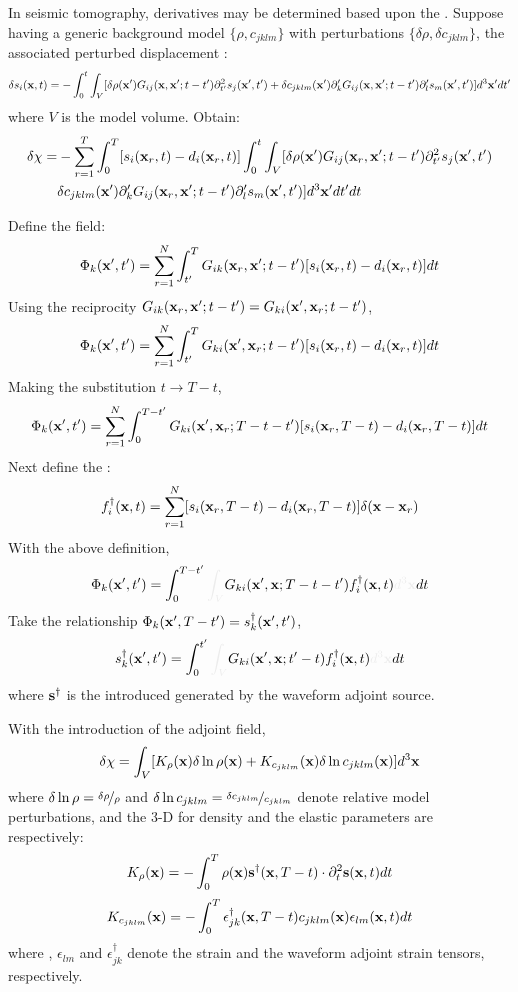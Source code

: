 In seismic tomography,
\Frechet derivatives may be determined based upon the .
Suppose having a generic background model $\{\rho,c_{jklm}\}$
with perturbations $\{\delta\rho,\delta c_{jklm}\}$,
the associated perturbed displacement
:
\[ \delta s_i(\mathbf{x},t)=-\int_0^t\int_V[\delta\rho(\mathbf{x}')G_{ij}(\mathbf{x},\mathbf{x}';t-t')\partial_{t'}^2s_j(\mathbf{x}',t')+\delta c_{jklm}(\mathbf{x}')\partial_k^\prime G_{ij}(\mathbf{x},\mathbf{x}';t-t')\partial_l^\prime s_m(\mathbf{x}',t')]d^3\mathbf{x}'dt' \]
where $V$ is the model volume. Obtain:
\begin{align*}
  \delta\chi= & -\sum_{r=1}^T\int_0^T[s_i(\mathbf{x}_r,t)-d_i(\mathbf{x}_r,t)]\int_0^t\int_V[\delta\rho(\mathbf{x}')G_{ij}(\mathbf{x}_r,\mathbf{x}';t-t')\partial_{t'}^2s_j(\mathbf{x}',t') \\
    & \delta c_{jklm}(\mathbf{x}')\partial_k^\prime G_{ij}(\mathbf{x}_r,\mathbf{x}';t-t')\partial_l^\prime s_m(\mathbf{x}',t')]d^3\mathbf{x}'dt'dt
\end{align*}

Define the field:
\[ \Phi_k(\mathbf{x}',t')=\sum_{r=1}^N\int_{t'}^TG_{ik}(\mathbf{x}_r,\mathbf{x}';t-t')[s_i(\mathbf{x}_r,t)-d_i(\mathbf{x}_r,t)]dt \]
Using the reciprocity $G_{ik}(\mathbf{x}_r,\mathbf{x}';t-t')=G_{ki}(\mathbf{x}',\mathbf{x}_r;t-t')$,
\[ \Phi_k(\mathbf{x}',t')=\sum_{r=1}^N\int_{t'}^TG_{ki}(\mathbf{x}',\mathbf{x}_r;t-t')[s_i(\mathbf{x}_r,t)-d_i(\mathbf{x}_r,t)]dt \]
Making the substitution $t\rightarrow T-t$,
\[ \Phi_k(\mathbf{x}',t')=\sum_{r=1}^N\int_0^{T-t'}G_{ki}(\mathbf{x}',\mathbf{x}_r;T-t-t')[s_i(\mathbf{x}_r,T-t)-d_i(\mathbf{x}_r,T-t)]dt \]
Next define the :
\[ f_i^\dagger(\mathbf{x},t)=\sum_{r=1}^N[s_i(\mathbf{x}_r,T-t)-d_i(\mathbf{x}_r,T-t)]\delta(\mathbf{x}-\mathbf{x}_r) \]
With the above definition,
\[ \Phi_k(\mbf x',t')=\int_0^{T-t'}\myde{\int_V}G_{ki}(\mbf x',\mbf x;T-t-t')f_i^\dagger(\mbf x,t)\myde{d^3\mbf x}dt \]
Take the relationship $\Phi_k(\mathbf{x}',T-t')=s_k^\dagger(\mathbf{x}',t')$,
\[ s_k^\dagger(\mbf x',t')=\int_0^{t'}\myde{\int_V}G_{ki}(\mbf x',\mbf x;t'-t)f_i^\dagger(\mbf x,t)\myde{d^3\mbf x}dt \]
where $\mathbf{s}^\dagger$ is the introduced 
generated by the waveform adjoint source.

With the introduction of the adjoint field,
\[ \delta\chi=\int_V[K_\rho(\mathbf{x})\delta\ln\rho(\mathbf{x})+K_{c_{jklm}}(\mathbf{x})\delta\ln c_{jklm}(\mathbf{x})]d^3\mathbf{x} \]
where
$\delta\ln\rho=\nicefrac{\delta\rho}{\rho}$ and $\delta\ln c_{jklm}=\nicefrac{\delta c_{jklm}}{c_{jklm}}$
denote relative model perturbations,
and the 3-D 
for density and the elastic parameters are respectively:
\[ K_\rho(\mathbf{x})=-\int_0^T\rho(\mathbf{x})\mathbf{s}^\dagger(\mathbf{x},T-t)\cdot\partial_t^2\mathbf{s}(\mathbf{x},t)dt \]
\[ K_{c_{jklm}}(\mathbf{x})=-\int_0^T\epsilon_{jk}^\dagger(\mathbf{x},T-t)c_{jklm}(\mathbf{x})\epsilon_{lm}(\mathbf{x},t)dt \]
where
,
$\epsilon_{lm}$ and $\epsilon_{jk}^\dagger$
denote the strain and the waveform adjoint strain tensors, respectively.

